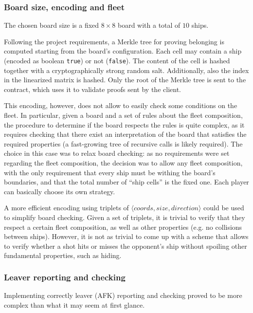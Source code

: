 \subsubsection{Board size, encoding and fleet}
\label{sec:implementation-contract-board}
The chosen board size is a fixed $8 \times 8$ board with a total of $10$ ships.

Following the project requirements, a Merkle tree for proving belonging is
computed starting from the board's configuration. Each cell may contain a ship
(encoded as boolean \texttt{true}) or not
(\texttt{false}). The content of the cell is hashed together with
a cryptographically strong random salt. Additionally, also the index in the
linearized matrix is hashed. Only the root of the Merkle tree is sent to the
contract, which uses it to validate proofs sent by the client.

This encoding, however, does not allow to easily check some conditions on the
fleet. In particular, given a board and a set of rules about the fleet
composition, the procedure to determine if the board respects the rules is
quite complex, as it requires checking that there exist an interpretation of
the board that satisfies the required properties (a fast-growing tree of
recursive calls is likely required). The choice in this case was to relax board
checking: as no requirements were set regarding the fleet composition, the
decision was to allow any fleet composition, with the only requirement that
every ship must be withing the board's boundaries, and that the total number of
``ship cells'' is the fixed one. Each player can basically choose its own
strategy.

A more efficient encoding using triplets of $\langle coords, size,
	direction\rangle$ could be used to simplify board checking. Given a set of
triplets, it is trivial to verify that they respect a certain fleet
composition, as well as other properties (e.g. no collisions between ships).
However, it is not as trivial to come up with a scheme that allows to verify
whether a shot hits or misses the opponent's ship without spoiling other
fundamental properties, such as hiding.

\subsubsection{Leaver reporting and checking}
\label{sec:implementation-contract-leaver-reporting}
Implementing correctly leaver (AFK) reporting and checking proved to be more
complex than what it may seem at first glance.

